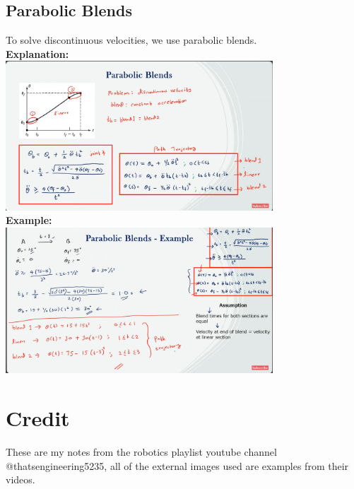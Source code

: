 \documentclass{article}
\begin{document}
\subsection{Parabolic Blends}
To solve discontinuous velocities, we use parabolic blends.\\
\textbf{Explanation:}\\
\includegraphics[width=10cm]{parabolic_explanation.png}\\
\textbf{Example:}\\
\includegraphics[width=10cm]{parabolic_example.png}


\section{Credit}
These are my notes from the robotics playlist youtube channel @thatsengineering5235, all of the external images used are examples from their videos. 
\end{document}
